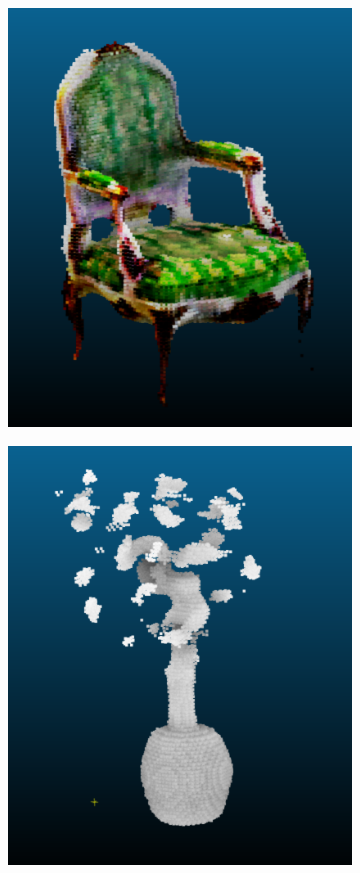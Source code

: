 \documentclass{article}
\begin{document}
\begin{figure}[!h]
\begin{subfigure}{.24\textwidth}
  \centering
  \includegraphics[width=\linewidth]{figs/pc/chairc.png}  
\end{subfigure}
\begin{subfigure}{.24\textwidth}
  \centering
  \includegraphics[width=\linewidth]{figs/pc/ficus.png}  

\end{subfigure}
\end{figure}
\end{document}
